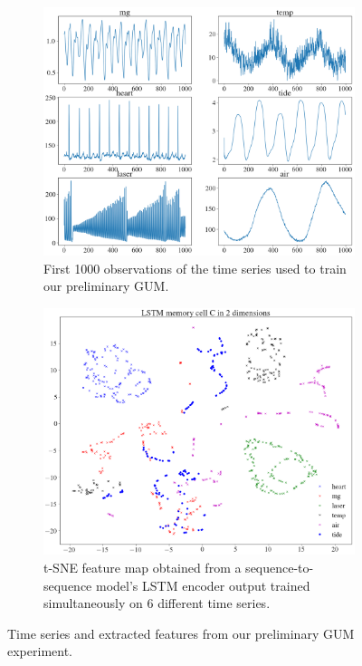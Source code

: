 \documentclass[pdftex,12pt,a4paper]{article}
\theoremstyle{definition}
\theoremstyle{remark}
\begin{document}
\begin{figure}
    \centering
    \begin{subfigure}[b]{0.7\textwidth}
        \includegraphics[width=\textwidth]{ts_gum.png}
        \caption{First 1000 observations of the time series used to train our preliminary GUM.}
        \label{fig:ts}
    \end{subfigure}
	
    \begin{subfigure}[b]{0.7\textwidth}
       \includegraphics[width=\textwidth]{gumtree_prelim.png}
        \caption{t-SNE feature map obtained from a sequence-to-sequence model's LSTM encoder output trained simultaneously on 6 different time series.}
        \label{fig:tsne}
    \end{subfigure}
	\label{fig:gumtree}
	
	\caption{Time series and extracted features from our preliminary GUM experiment.}
\end{figure}
\end{document}
